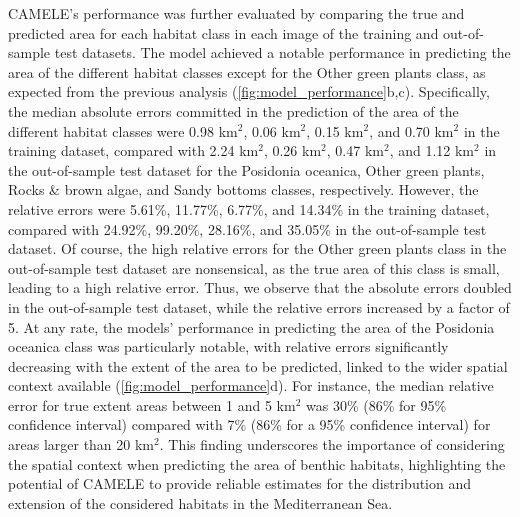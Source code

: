 CAMELE's performance was further evaluated by comparing the true and predicted
area for each habitat class in each image of the training and out-of-sample
test datasets. The model achieved a notable performance in predicting the area
of the different habitat classes except for the Other green plants class,
as expected from the previous analysis (\cref{fig:model_performance}b,c).
Specifically, the median absolute errors committed in the prediction of the
area of the different habitat classes were 0.98 km$^2$, 0.06 km$^2$, 0.15
km$^2$, and 0.70 km$^2$ in the training dataset, compared with 2.24 km$^2$,
0.26 km$^2$, 0.47 km$^2$, and 1.12 km$^2$ in the out-of-sample test dataset
for the Posidonia oceanica, Other green plants, Rocks \& brown algae,
and Sandy bottoms classes, respectively. However, the relative errors
were 5.61\%, 11.77\%, 6.77\%, and 14.34\% in the training dataset, compared
with 24.92\%, 99.20\%, 28.16\%, and 35.05\% in the out-of-sample test dataset.
Of course, the high relative errors for the Other green plants
class in the out-of-sample test dataset are nonsensical, as the true area of
this class is small, leading to a high relative error. Thus, we observe
that the absolute errors doubled in the out-of-sample test dataset, while the
relative errors increased by a factor of 5. At any rate, the models'
performance in predicting the area of the Posidonia oceanica class was
particularly notable, with relative errors significantly decreasing with
the extent of the area to be predicted, linked to the wider spatial context
available (\cref{fig:model_performance}d). For instance, the median relative
error for true extent areas between 1 and 5 km$^2$ was 30\% (86\% for 95\%
confidence interval) compared with 7\% (86\% for a 95\% confidence interval)
for areas larger than 20 km$^2$.  This finding underscores the importance of
considering the spatial context when predicting the area of benthic habitats,
highlighting the potential of CAMELE to provide reliable estimates for the
distribution and extension of the considered habitats in the Mediterranean Sea.

